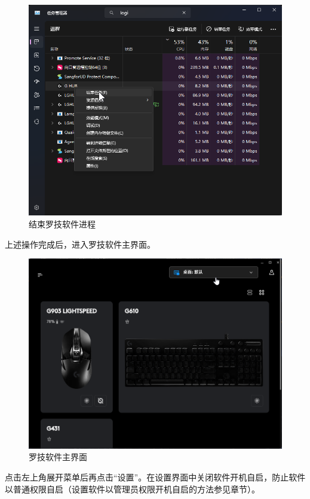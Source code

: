 \begin{figure}[H]
    \Centering
    \includegraphics[width=\textwidth]{docs/assets/terminate_lghub_01.png}
    \caption{结束罗技软件进程}
\end{figure}

上述操作完成后，进入罗技软件主界面。

\begin{figure}[H]
    \Centering
    \includegraphics[width=\textwidth]{docs/assets/lghub.png}
    \caption{罗技软件主界面}
\end{figure}

点击左上角展开菜单后再点击“设置”。在设置界面中关闭软件开机自启，防止软件以普通权限自启（设置软件以管理员权限开机自启的方法参见章节）。

